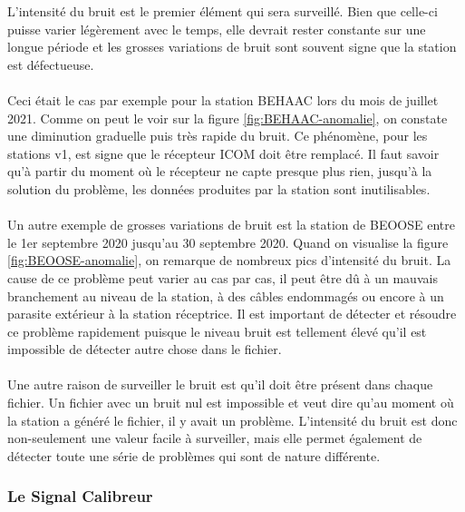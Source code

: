 \documentclass[11pt]{article}
\begin{document}
L'intensité du bruit est le premier élément qui sera surveillé.
Bien que celle-ci puisse varier légèrement avec le temps, elle devrait rester constante sur une longue période et les grosses variations de bruit sont souvent signe que la station est défectueuse.\\
\\
Ceci était le cas par exemple pour la station BEHAAC lors du mois de juillet 2021.
Comme on peut le voir sur la figure \ref{fig:BEHAAC-anomalie}, on constate une diminution graduelle puis très rapide du bruit.
Ce phénomène, pour les stations v1, est signe que le récepteur ICOM doit être remplacé.
Il faut savoir qu'à partir du moment où le récepteur ne capte presque plus rien, jusqu'à la solution du problème, les données produites par la station sont inutilisables.\\
\\
Un autre exemple de grosses variations de bruit est la station de BEOOSE entre le 1er septembre 2020 jusqu'au 30 septembre 2020.
Quand on visualise la figure \ref{fig:BEOOSE-anomalie}, on remarque de nombreux pics d'intensité du bruit.
La cause de ce problème peut varier au cas par cas, il peut être dû à un mauvais branchement au niveau de la station, à des câbles endommagés ou encore à un parasite extérieur à la station réceptrice.
Il est important de détecter et résoudre ce problème rapidement puisque le niveau bruit est tellement élevé qu'il est impossible de détecter autre chose dans le fichier.\\
\\
Une autre raison de surveiller le bruit est qu'il doit être présent dans chaque fichier.
Un fichier avec un bruit nul est impossible et veut dire qu'au moment où la station a généré le fichier, il y avait un problème.
L'intensité du bruit est donc non-seulement une valeur facile à surveiller, mais elle permet également de détecter toute une série de problèmes qui sont de nature différente.

\subsubsection{Le Signal Calibreur}
\end{document}
